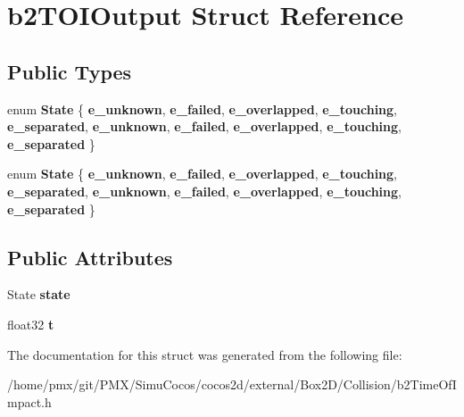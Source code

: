 \hypertarget{structb2TOIOutput}{}\section{b2\+T\+O\+I\+Output Struct Reference}
\label{structb2TOIOutput}
\subsection*{Public Types}
\begin{DoxyCompactItemize}
\item 
\mbox{\label{structb2TOIOutput_a12c3cf4dc0551f5c8249dc1dd867959a}} 
enum {\bfseries State} \{ \newline
{\bfseries e\+\_\+unknown}, 
{\bfseries e\+\_\+failed}, 
{\bfseries e\+\_\+overlapped}, 
{\bfseries e\+\_\+touching}, 
\newline
{\bfseries e\+\_\+separated}, 
{\bfseries e\+\_\+unknown}, 
{\bfseries e\+\_\+failed}, 
{\bfseries e\+\_\+overlapped}, 
\newline
{\bfseries e\+\_\+touching}, 
{\bfseries e\+\_\+separated}
 \}
\item 
\mbox{\label{structb2TOIOutput_a12c3cf4dc0551f5c8249dc1dd867959a}} 
enum {\bfseries State} \{ \newline
{\bfseries e\+\_\+unknown}, 
{\bfseries e\+\_\+failed}, 
{\bfseries e\+\_\+overlapped}, 
{\bfseries e\+\_\+touching}, 
\newline
{\bfseries e\+\_\+separated}, 
{\bfseries e\+\_\+unknown}, 
{\bfseries e\+\_\+failed}, 
{\bfseries e\+\_\+overlapped}, 
\newline
{\bfseries e\+\_\+touching}, 
{\bfseries e\+\_\+separated}
 \}
\end{DoxyCompactItemize}
\subsection*{Public Attributes}
\begin{DoxyCompactItemize}
\item 
\mbox{\label{structb2TOIOutput_aaacbf28f437b965ffecabf1407a77915}} 
State {\bfseries state}
\item 
\mbox{\label{structb2TOIOutput_a94f8b756e060892226ec006db4be7ee3}} 
float32 {\bfseries t}
\end{DoxyCompactItemize}


The documentation for this struct was generated from the following file\+:\begin{DoxyCompactItemize}
\item 
/home/pmx/git/\+P\+M\+X/\+Simu\+Cocos/cocos2d/external/\+Box2\+D/\+Collision/b2\+Time\+Of\+Impact.\+h\end{DoxyCompactItemize}

